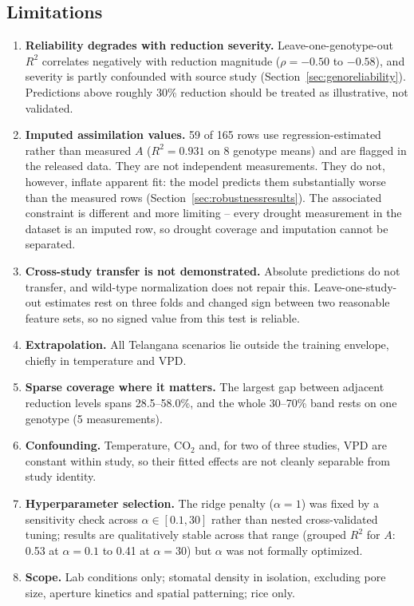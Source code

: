 \documentclass[runningheads]{llncs}
\begin{document}
\subsection{Limitations}\label{sec:limitations}
\begin{enumerate}
    \item \textbf{Reliability degrades with reduction severity.} Leave-one-genotype-out $R^{2}$ correlates negatively with reduction magnitude ($\rho=-0.50$ to $-0.58$), and severity is partly confounded with source study (Section~\ref{sec:genoreliability}). Predictions above roughly 30\% reduction should be treated as illustrative, not validated.
    \item \textbf{Imputed assimilation values.} 59 of 165 rows use regression-estimated rather than measured $A$ ($R^{2}=0.931$ on 8 genotype means) and are flagged in the released data. They are not independent measurements. They do not, however, inflate apparent fit: the model predicts them substantially worse than the measured rows (Section~\ref{sec:robustnessresults}). The associated constraint is different and more limiting -- every drought measurement in the dataset is an imputed row, so drought coverage and imputation cannot be separated.
    \item \textbf{Cross-study transfer is not demonstrated.} Absolute predictions do not transfer, and wild-type normalization does not repair this. Leave-one-study-out estimates rest on three folds and changed sign between two reasonable feature sets, so no signed value from this test is reliable.
    \item \textbf{Extrapolation.} All Telangana scenarios lie outside the training envelope, chiefly in temperature and VPD.
    \item \textbf{Sparse coverage where it matters.} The largest gap between adjacent reduction levels spans 28.5--58.0\%, and the whole 30--70\% band rests on one genotype (5 measurements).
    \item \textbf{Confounding.} Temperature, CO$_2$ and, for two of three studies, VPD are constant within study, so their fitted effects are not cleanly separable from study identity.
    \item \textbf{Hyperparameter selection.} The ridge penalty ($\alpha=1$) was fixed by a sensitivity check across $\alpha\in[0.1,30]$ rather than nested cross-validated tuning; results are qualitatively stable across that range (grouped $R^2$ for $A$: 0.53 at $\alpha=0.1$ to 0.41 at $\alpha=30$) but $\alpha$ was not formally optimized.
    \item \textbf{Scope.} Lab conditions only; stomatal density in isolation, excluding pore size, aperture kinetics and spatial patterning; rice only.

\end{enumerate}
\end{document}
